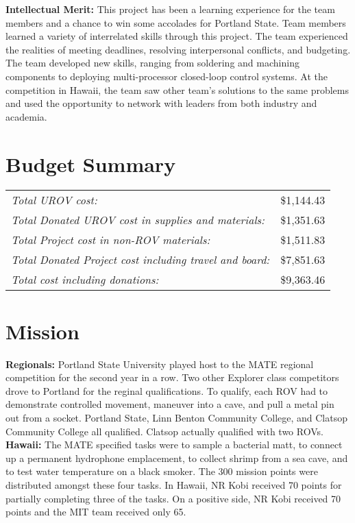 \documentclass{article}
\begin{document}
\noindent
{\bf Intellectual Merit:}
This project has been a learning experience for the team members and a chance to win some accolades for Portland State. Team members learned 
a variety of interrelated skills through this project. The team experienced the realities of meeting deadlines, resolving interpersonal conflicts, and budgeting. The team developed new skills, ranging from soldering and machining components to deploying 
multi-processor closed-loop control systems. At the competition in Hawaii, the team saw other team's solutions to the same problems and used the 
opportunity to network with leaders from both industry and academia. 



\section{Budget Summary}
\begin{tabular}[t]{lr}
\it Total UROV cost: &\$1,144.43\\
\it Total Donated UROV cost in supplies and materials: &\$1,351.63\\
\it Total Project cost in non-ROV materials: &\$1,511.83\\
\it Total Donated Project cost including travel and board: &\$7,851.63\\\hline
\it Total cost including donations: &\$9,363.46\\
\end{tabular}

\noindent
\section{Mission}
\noindent
{\bf Regionals:}
Portland State University played host to the MATE regional competition for the second year in a row. Two other Explorer class competitors drove to Portland for the reginal qualifications. To qualify, each ROV had to demonstrate controlled movement, maneuver into a cave, and pull a metal pin out from a socket. Portland State, Linn Benton Community College, and Clatsop Community College all qualified. Clatsop actually qualified with two ROVs.   
\\

\noindent
{\bf Hawaii:}
The MATE specified tasks were to sample a bacterial matt, to connect up a permanent hydrophone emplacement, to collect shrimp from a sea cave, and to test water temperature on a black smoker. The 300 mission points were distributed amongst these four tasks. In Hawaii, NR Kobi received 70 points for partially completing three of the tasks. On a positive side, NR Kobi received 70 points and the MIT team received only 65. 
\end{document}
